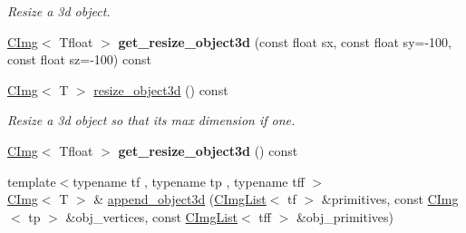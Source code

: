 \begin{DoxyCompactItemize}
\begin{DoxyCompactList}\small\item\em Resize a 3d object. \item\end{DoxyCompactList}\item 
\hypertarget{structcimg__library_1_1CImg_ad2c8f5b3925f96818b6be80e671a8a61}{
\hyperlink{structcimg__library_1_1CImg}{CImg}$<$ Tfloat $>$ {\bfseries get\_\-resize\_\-object3d} (const float sx, const float sy=-\/100, const float sz=-\/100) const }
\label{structcimg__library_1_1CImg_ad2c8f5b3925f96818b6be80e671a8a61}

\item 
\hypertarget{structcimg__library_1_1CImg_aedb6c6dc25f669f5af7d3fe55978addc}{
\hyperlink{structcimg__library_1_1CImg}{CImg}$<$ T $>$ \hyperlink{structcimg__library_1_1CImg_aedb6c6dc25f669f5af7d3fe55978addc}{resize\_\-object3d} () const }
\label{structcimg__library_1_1CImg_aedb6c6dc25f669f5af7d3fe55978addc}

\begin{DoxyCompactList}\small\item\em Resize a 3d object so that its max dimension if one. \item\end{DoxyCompactList}\item 
\hypertarget{structcimg__library_1_1CImg_a59fffbf1fb8d5f9b5db4a772da0c40cc}{
\hyperlink{structcimg__library_1_1CImg}{CImg}$<$ Tfloat $>$ {\bfseries get\_\-resize\_\-object3d} () const }
\label{structcimg__library_1_1CImg_a59fffbf1fb8d5f9b5db4a772da0c40cc}

\item 
\hypertarget{structcimg__library_1_1CImg_a83795930d9762a823103c482d72800ea}{
{\footnotesize template$<$typename tf , typename tp , typename tff $>$ }\\\hyperlink{structcimg__library_1_1CImg}{CImg}$<$ T $>$ \& \hyperlink{structcimg__library_1_1CImg_a83795930d9762a823103c482d72800ea}{append\_\-object3d} (\hyperlink{structcimg__library_1_1CImgList}{CImgList}$<$ tf $>$ \&primitives, const \hyperlink{structcimg__library_1_1CImg}{CImg}$<$ tp $>$ \&obj\_\-vertices, const \hyperlink{structcimg__library_1_1CImgList}{CImgList}$<$ tff $>$ \&obj\_\-primitives)}
\label{structcimg__library_1_1CImg_a83795930d9762a823103c482d72800ea}


\end{DoxyCompactItemize}
